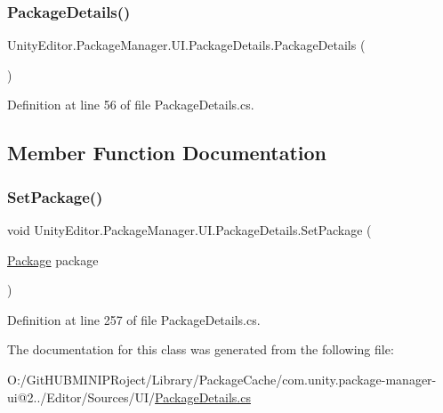 \subsubsection{\texorpdfstring{PackageDetails()}{PackageDetails()}}
{\footnotesize\ttfamily Unity\+Editor.\+Package\+Manager.\+U\+I.\+Package\+Details.\+Package\+Details (\begin{DoxyParamCaption}{ }\end{DoxyParamCaption})}



Definition at line 56 of file Package\+Details.\+cs.



\subsection{Member Function Documentation}
\mbox{\label{class_unity_editor_1_1_package_manager_1_1_u_i_1_1_package_details_a712f501a6f645d732641337a9e3c5654}} 
\subsubsection{\texorpdfstring{SetPackage()}{SetPackage()}}
{\footnotesize\ttfamily void Unity\+Editor.\+Package\+Manager.\+U\+I.\+Package\+Details.\+Set\+Package (\begin{DoxyParamCaption}\item[{\mbox{\hyperlink{class_unity_editor_1_1_package_manager_1_1_u_i_1_1_package}{Package}}}]{package }\end{DoxyParamCaption})}



Definition at line 257 of file Package\+Details.\+cs.



The documentation for this class was generated from the following file\+:\begin{DoxyCompactItemize}
\item 
O\+:/\+Git\+H\+U\+B\+M\+I\+N\+I\+P\+Roject/\+Library/\+Package\+Cache/com.\+unity.\+package-\/manager-\/ui@2../\+Editor/\+Sources/\+U\+I/\mbox{\hyperlink{_package_details_8cs}{Package\+Details.\+cs}}\end{DoxyCompactItemize}
